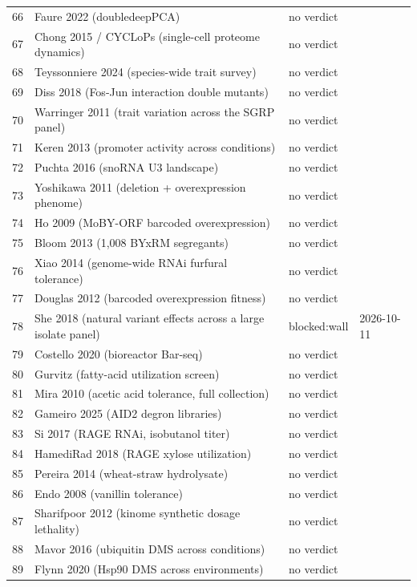 \begin{longtable}{@{}r L{88mm} L{40mm} L{24mm}@{}}
66 & Faure 2022 (doubledeepPCA) & no verdict &  \\
67 & Chong 2015 / CYCLoPs (single-cell proteome dynamics) & no verdict &  \\
68 & Teyssonniere 2024 (species-wide trait survey) & no verdict &  \\
69 & Diss 2018 (Fos-Jun interaction double mutants) & no verdict &  \\
70 & Warringer 2011 (trait variation across the SGRP panel) & no verdict &  \\
71 & Keren 2013 (promoter activity across conditions) & no verdict &  \\
72 & Puchta 2016 (snoRNA U3 landscape) & no verdict &  \\
73 & Yoshikawa 2011 (deletion + overexpression phenome) & no verdict &  \\
74 & Ho 2009 (MoBY-ORF barcoded overexpression) & no verdict &  \\
75 & Bloom 2013 (1,008 BYxRM segregants) & no verdict &  \\
76 & Xiao 2014 (genome-wide RNAi furfural tolerance) & no verdict &  \\
77 & Douglas 2012 (barcoded overexpression fitness) & no verdict &  \\
78 & She 2018 (natural variant effects across a large isolate panel) & blocked:wall & 2026-10-11 \\
79 & Costello 2020 (bioreactor Bar-seq) & no verdict &  \\
80 & Gurvitz (fatty-acid utilization screen) & no verdict &  \\
81 & Mira 2010 (acetic acid tolerance, full collection) & no verdict &  \\
82 & Gameiro 2025 (AID2 degron libraries) & no verdict &  \\
83 & Si 2017 (RAGE RNAi, isobutanol titer) & no verdict &  \\
84 & HamediRad 2018 (RAGE xylose utilization) & no verdict &  \\
85 & Pereira 2014 (wheat-straw hydrolysate) & no verdict &  \\
86 & Endo 2008 (vanillin tolerance) & no verdict &  \\
87 & Sharifpoor 2012 (kinome synthetic dosage lethality) & no verdict &  \\
88 & Mavor 2016 (ubiquitin DMS across conditions) & no verdict &  \\
89 & Flynn 2020 (Hsp90 DMS across environments) & no verdict &  \\

\end{longtable}
